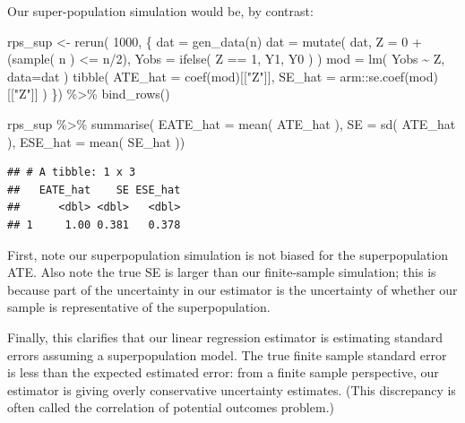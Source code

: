 \documentclass[
]{book}
\newenvironment{Shaded}{\begin{snugshade}}{\end{snugshade}}
\newcommand{\AttributeTok}[1]{\textcolor[rgb]{0.77,0.63,0.00}{#1}}
\newcommand{\DecValTok}[1]{\textcolor[rgb]{0.00,0.00,0.81}{#1}}
\newcommand{\FunctionTok}[1]{\textcolor[rgb]{0.00,0.00,0.00}{#1}}
\newcommand{\NormalTok}[1]{#1}
\newcommand{\OtherTok}[1]{\textcolor[rgb]{0.56,0.35,0.01}{#1}}
\newcommand{\SpecialCharTok}[1]{\textcolor[rgb]{0.00,0.00,0.00}{#1}}
\newcommand{\StringTok}[1]{\textcolor[rgb]{0.31,0.60,0.02}{#1}}
\begin{document}
Our super-population simulation would be, by contrast:

\begin{Shaded}
\begin{Highlighting}[]
\NormalTok{rps\_sup }\OtherTok{\textless{}{-}} \FunctionTok{rerun}\NormalTok{( }\DecValTok{1000}\NormalTok{, \{}
\NormalTok{  dat }\OtherTok{=} \FunctionTok{gen\_data}\NormalTok{(n)}
\NormalTok{  dat }\OtherTok{=} \FunctionTok{mutate}\NormalTok{( dat,}
              \AttributeTok{Z =} \DecValTok{0} \SpecialCharTok{+}\NormalTok{ (}\FunctionTok{sample}\NormalTok{( n ) }\SpecialCharTok{\textless{}=}\NormalTok{ n}\SpecialCharTok{/}\DecValTok{2}\NormalTok{),}
              \AttributeTok{Yobs =} \FunctionTok{ifelse}\NormalTok{( Z }\SpecialCharTok{==} \DecValTok{1}\NormalTok{, Y1, Y0 ) )}
\NormalTok{  mod }\OtherTok{=} \FunctionTok{lm}\NormalTok{( Yobs }\SpecialCharTok{\textasciitilde{}}\NormalTok{ Z, }\AttributeTok{data=}\NormalTok{dat )}
  \FunctionTok{tibble}\NormalTok{( }\AttributeTok{ATE\_hat =} \FunctionTok{coef}\NormalTok{(mod)[[}\StringTok{"Z"}\NormalTok{]],}
          \AttributeTok{SE\_hat =}\NormalTok{ arm}\SpecialCharTok{::}\FunctionTok{se.coef}\NormalTok{(mod)[[}\StringTok{"Z"}\NormalTok{]] )}
\NormalTok{  \}) }\SpecialCharTok{\%\textgreater{}\%}
  \FunctionTok{bind\_rows}\NormalTok{()}

\NormalTok{rps\_sup }\SpecialCharTok{\%\textgreater{}\%} \FunctionTok{summarise}\NormalTok{( }\AttributeTok{EATE\_hat =} \FunctionTok{mean}\NormalTok{( ATE\_hat ),}
                   \AttributeTok{SE =} \FunctionTok{sd}\NormalTok{( ATE\_hat ),}
                   \AttributeTok{ESE\_hat =} \FunctionTok{mean}\NormalTok{( SE\_hat ))}
\end{Highlighting}
\end{Shaded}

\begin{verbatim}
## # A tibble: 1 x 3
##   EATE_hat    SE ESE_hat
##      <dbl> <dbl>   <dbl>
## 1     1.00 0.381   0.378
\end{verbatim}

First, note our superpopulation simulation is not biased for the superpopulation ATE.
Also note the true SE is larger than our finite-sample simulation; this is because part of the uncertainty in our estimator is the uncertainty of whether our sample is representative of the superpopulation.

Finally, this clarifies that our linear regression estimator is estimating standard errors assuming a superpopulation model.
The true finite sample standard error is less than the expected estimated error: from a finite sample perspective, our estimator is giving overly conservative uncertainty estimates.
(This discrepancy is often called the correlation of potential outcomes problem.)
\end{document}
